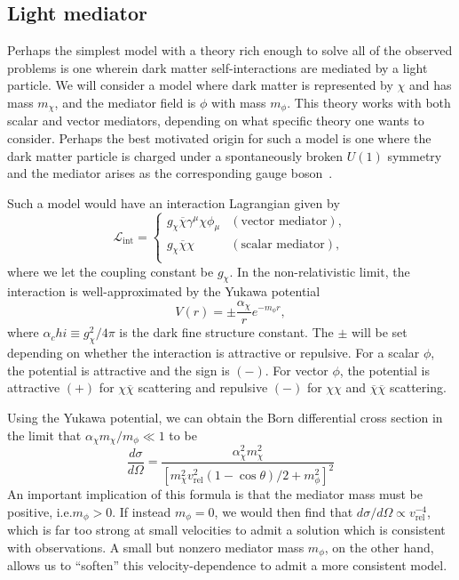 \hypertarget{light-mediator}{%
\subsection{Light mediator}\label{light-mediator}}

Perhaps the simplest model with a theory rich enough to solve all of the
observed problems is one wherein dark matter self-interactions are
mediated by a light particle. We will consider a model where dark matter
is represented by \(\chi\) and has mass \(m_\chi\), and the mediator
field is \(\phi\) with mass \(m_\phi\). This theory works with both
scalar and vector mediators, depending on what specific theory one wants
to consider. Perhaps the best motivated origin for such a model is one
where the dark matter particle is charged under a spontaneously broken
\(U(1)\) symmetry and the mediator arises as the corresponding gauge
boson~\cite{tulin_dark_2018}.

Such a model would have an interaction Lagrangian given by
\begin{equation}
\mathcal{L}_{\text{int}} =
\left\{ 
\begin{array}{cl}
    g_\chi \overline{\chi} \gamma^\mu \chi \phi_\mu
    & (\text{vector mediator}), \\
    g_\chi \overline{\chi} \chi
    & (\text{scalar mediator}), \\
\end{array}
\right.
\end{equation}
where we let the coupling constant be \(g_\chi\). In the non-relativistic
limit, the interaction is well-approximated by the Yukawa potential~\cite{tulin_beyond_2013,tulin_resonant_2013}
\begin{equation}
V(r) = \pm \frac{\alpha_\chi}{r} e^{-m_\phi r},
\end{equation}
where
\(\alpha_chi \equiv g_\chi^2/4\pi\) is the dark fine structure constant. The
\(\pm\) will be set depending on whether the interaction is attractive or
repulsive. For a scalar \(\phi\), the potential is attractive and the sign is
\((-)\). For vector \(\phi\), the potential is attractive \((+)\) for
\(\chi\overline{\chi}\) scattering and repulsive \((-)\) for \(\chi\chi\) and
\(\overline{\chi}\overline{\chi}\) scattering.

Using the Yukawa potential, we can obtain the Born differential cross section
in the limit that \(\alpha_\chi m_\chi / m_\phi \ll 1\) to
be~\cite{tulin_dark_2018}
\begin{equation}
\frac{d\sigma}{d\Omega} = \frac{\alpha_\chi^2 m_\chi^2}{\left[
    m_\chi^2 v_{\text{rel}}^2 (1 - \cos\theta) / 2
    + m_\phi^2 \right]^2}
\end{equation}
An important implication of this formula is that the mediator mass must be
positive, i.e.\(m_\phi > 0\). If instead \(m_\phi = 0\), we would then find
that \( d\sigma/d\Omega \propto v_{\text{rel}}^{-4}\), which is far too strong
at small velocities to admit a solution which is consistent with observations.
A small but nonzero mediator mass \(m_\phi\), on the other hand, allows us to
``soften'' this velocity-dependence to admit a more consistent model.

